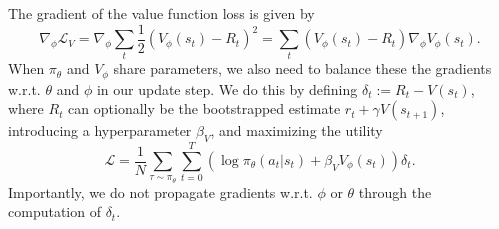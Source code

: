 The gradient of the value function loss is given by
\begin{equation}
    \nabla_\phi \mathcal{L}_V = \nabla_\phi \sum_t \frac12  (V_\phi(s_t) - R_t)^2 = \sum_t (V_\phi(s_t) - R_t) \nabla_\phi V_\phi(s_t).
\end{equation}
When $\pi_\theta$ and $V_\phi$ share parameters, we also need to balance these the gradients w.r.t. $\theta$ and $\phi$ in our update step.
We do this by defining $\delta_t := R_t - V(s_t)$, where $R_t$ can optionally be the bootstrapped estimate $r_t + \gamma V(s_{t+1})$, introducing a hyperparameter $\beta_V$, and maximizing the utility
\begin{equation}
    \mathcal{L} = \frac{1}{N} \sum_{\tau \sim \pi_\theta} \sum_{t=0}^T ( \log \pi_\theta (a_t|s_t) + \beta_V V_\phi(s_t) ) \delta_t .
\end{equation}
Importantly, we do not propagate gradients w.r.t. $\phi$ or $\theta$ through the computation of $\delta_t$.

